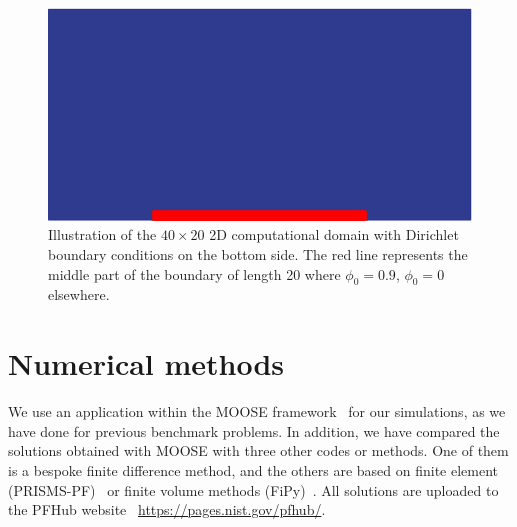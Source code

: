 \documentclass[preprint,12pt]{elsarticle}
\begin{document}
%
\begin{center}
\begin{figure} 
\begin{centering}
\includegraphics[scale=0.50]{t0_athermal_thick.PNG}
\par\end{centering}
\caption{Illustration of the $40 \times 20$ 2D computational domain with Dirichlet boundary conditions on the bottom side. The red line represents the middle part of the boundary of length 20 where $\phi_{0}=0.9$, $\phi_{0}=0$ elsewhere.} \label{fig:t0_athermal_thick}
\end{figure}
\par\end{center}
%

\section{Numerical methods}

We use an application within the MOOSE framework~\cite{gaston2014continuous,gaston2015physics} for our simulations, as we have done for previous benchmark problems. In addition, we have compared the solutions obtained with MOOSE with three other codes or methods. One of them is a bespoke finite difference method, and the others are based on finite element (PRISMS-PF)~\cite{dewitt2020prisms} or finite volume methods (FiPy)~\cite{guyer2009fipy}. All solutions are uploaded to the PFHub website~\cite{wheeler2019pfhub} \url{https://pages.nist.gov/pfhub/}. %
\end{document}

